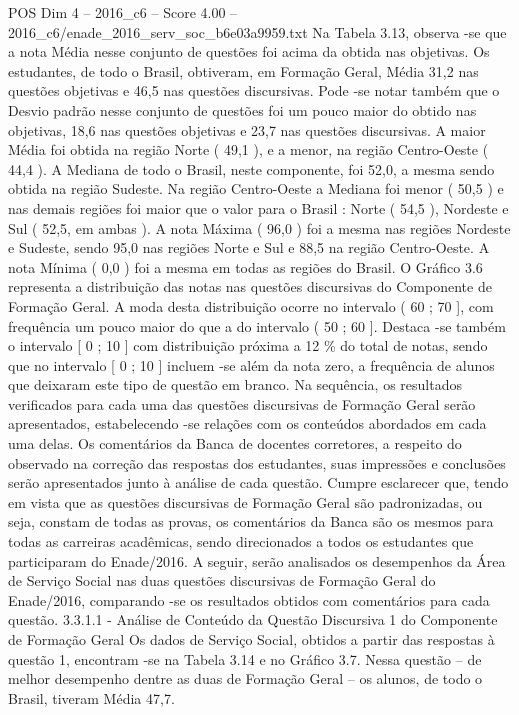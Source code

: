 \begin{textsample}{POS Dim 4 – 2016\_c6 – Score 4.00 – 2016\_c6/enade\_2016\_serv\_soc\_b6e03a9959.txt}
Na Tabela 3.13, observa -se que a nota Média nesse conjunto de questões foi acima da obtida nas objetivas.
Os estudantes, de todo o Brasil, obtiveram, em Formação Geral, Média 31,2 nas questões objetivas e 46,5 nas questões discursivas.
Pode -se notar também que o Desvio padrão nesse conjunto de questões foi um pouco maior do obtido nas objetivas, 18,6 nas questões objetivas e 23,7 nas questões discursivas.
A maior Média foi obtida na região Norte ( 49,1 ), e a menor, na região Centro-Oeste ( 44,4 ).
A Mediana de todo o Brasil, neste componente, foi 52,0, a mesma sendo obtida na região Sudeste.
Na região Centro-Oeste a Mediana foi menor ( 50,5 ) e nas demais regiões foi maior que o valor para o Brasil : Norte ( 54,5 ), Nordeste e Sul ( 52,5, em ambas ).
A nota Máxima ( 96,0 ) foi a mesma nas regiões Nordeste e Sudeste, sendo 95,0 nas regiões Norte e Sul e 88,5 na região Centro-Oeste.
A nota Mínima ( 0,0 ) foi a mesma em todas as regiões do Brasil.
O Gráfico 3.6 representa a distribuição das notas nas questões discursivas do Componente de Formação Geral.
A moda desta distribuição ocorre no intervalo ( 60 ; 70 ], com frequência um pouco maior do que a do intervalo ( 50 ; 60 ].
Destaca -se também o intervalo [ 0 ; 10 ] com distribuição próxima a 12 \% do total de notas, sendo que no intervalo [ 0 ; 10 ] incluem -se além da nota zero, a frequência de alunos que deixaram este tipo de questão em branco.
Na sequência, os resultados verificados para cada uma das questões discursivas de Formação Geral serão apresentados, estabelecendo -se relações com os conteúdos abordados em cada uma delas.
Os comentários da Banca de docentes corretores, a respeito do observado na correção das respostas dos estudantes, suas impressões e conclusões serão apresentados junto à análise de cada questão.
Cumpre esclarecer que, tendo em vista que as questões discursivas de Formação Geral são padronizadas, ou seja, constam de todas as provas, os comentários da Banca são os mesmos para todas as carreiras acadêmicas, sendo direcionados a todos os estudantes que participaram do Enade/2016.
A seguir, serão analisados os desempenhos da Área de Serviço Social nas duas questões discursivas de Formação Geral do Enade/2016, comparando -se os resultados obtidos com comentários para cada questão. 3.3.1.1 - Análise de Conteúdo da Questão Discursiva 1 do Componente de Formação Geral Os dados de Serviço Social, obtidos a partir das respostas à questão 1, encontram -se na Tabela 3.14 e no Gráfico 3.7.
Nessa questão – de melhor desempenho dentre as duas de Formação Geral – os alunos, de todo o Brasil, tiveram Média 47,7.

\end{textsample}
